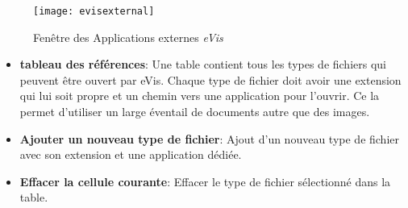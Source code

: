 \begin{figure}[htp]
   \begin{center}
\caption{\label{evisexternal}Fenêtre des Applications externes \emph{eVis} \nixcaption}
\texttt{[image: evisexternal]}
\end{center}
\end{figure}


\begin{itemize}
\item \textbf{tableau des références}: Une table contient tous les types de fichiers qui peuvent être ouvert par eVis. Chaque type de fichier doit avoir une extension qui lui soit propre et un chemin vers une application pour l'ouvrir. Ce la permet d'utiliser un large éventail de documents autre que des images.
\item \textbf{Ajouter un nouveau type de fichier}: Ajout d'un nouveau type de fichier avec son extension et une application dédiée.
\item \textbf{Effacer la cellule courante}: Effacer le type de fichier sélectionné dans la table.
\end{itemize}

\label{evis_specifying}

